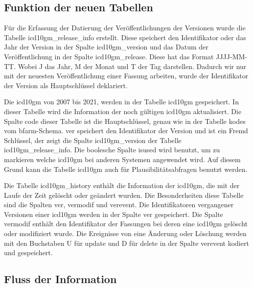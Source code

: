 \subsection{Funktion der neuen Tabellen} \label{newtables}

Für die Erfassung der Datierung der Veröffentlichungen der Versionen wurde die Tabelle \textsf{icd10gm\_release\_info} erstellt. Diese speichert den Identifikator oder das Jahr der Version in der Spalte \textsf{icd10gm\_version} und das Datum der Veröffentlichung in der Spalte \textsf{icd10gm\_release}. Diese hat das Format \textsf{JJJJ-MM-TT}. Wobei J das Jahr, M der Monat und T der Tag darstellen. Dadurch wir nur mit der neuesten Veröffentlichung einer Fassung arbeiten, wurde der Identifikator der Version als Hauptschlüssel deklariert.


Die \ac{icd10gm} von 2007 bis 2021, werden in der Tabelle \textsf{icd10gm} gespeichert. In dieser Tabelle wird die Information der noch gültigen \ac{icd10gm} aktualisiert. Die Spalte \textsf{code} dieser Tabelle ist die Hauptschlüssel, genau wie in der Tabelle \textsf{kodes} vom \ac{bfarm}-Schema. \textsf{ver} speichert den Identifikator der Version und ist ein Fremd Schlüssel, der zeigt die Spalte \textsf{icd10gm\_version} der Tabelle \textsf{icd10gm\_release\_info}. Die boolesche Spalte \textsf{isused} wird benutzt, um zu markieren welche \ac{icd10gm} bei anderen Systemen angewendet wird. Auf diesem Grund kann die Tabelle \textsf{icd10gm} auch für Plausibilitätsabfragen benutzt werden.

Die Tabelle \textsf{icd10gm\_history} enthält die Information der \ac{icd10gm}, die mit der Laufe der Zeit gelöscht oder geändert wurden. Die Besonderheiten diese Tabelle sind die Spalten \textsf{ver}, \textsf{vermodif} und \textsf{verevent}. Die Identifikatoren vergangener Versionen einer \ac{icd10gm} werden in der Spalte \textsf{ver} gespeichert. Die Spalte \textsf{vermodif} enthält den Identifikator der Fassungen bei deren eine \ac{icd10gm} gelöscht oder modifiziert wurde. Die Ereignisse von eine Änderung oder Löschung werden mit den Buchstaben \textsf{U} für \glqq\textsf{update}\grqq{} und \textsf{D} für \glqq\textsf{delete}\grqq{} in der Spalte \textsf{verevent} kodiert und gespeichert.

\subsection{Fluss der Information} \label{dbrun}

